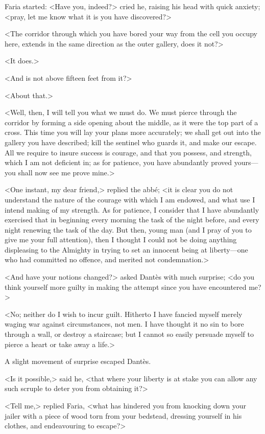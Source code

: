  Faria started: <Have you, indeed?> cried he, raising his head with quick anxiety; <pray, let me know what it is you have discovered?> 

 <The corridor through which you have bored your way from the cell you occupy here, extends in the same direction as the outer gallery, does it not?>

<It does.> 

 <And is not above fifteen feet from it?> 

 <About that.> 

 <Well, then, I will tell you what we must do. We must pierce through the corridor by forming a side opening about the middle, as it were the top part of a cross. This time you will lay your plans more accurately; we shall get out into the gallery you have described; kill the sentinel who guards it, and make our escape. All we require to insure success is courage, and that you possess, and strength, which I am not deficient in; as for patience, you have abundantly proved yours—you shall now see me prove mine.> 

 <One instant, my dear friend,> replied the abbé; <it is clear you do not understand the nature of the courage with which I am endowed, and what use I intend making of my strength. As for patience, I consider that I have abundantly exercised that in beginning every morning the task of the night before, and every night renewing the task of the day. But then, young man (and I pray of you to give me your full attention), then I thought I could not be doing anything displeasing to the Almighty in trying to set an innocent being at liberty—one who had committed no offence, and merited not condemnation.> 

 <And have your notions changed?> asked Dantès with much surprise; <do you think yourself more guilty in making the attempt since you have encountered me?> 

 <No; neither do I wish to incur guilt. Hitherto I have fancied myself merely waging war against circumstances, not men. I have thought it no sin to bore through a wall, or destroy a staircase; but I cannot so easily persuade myself to pierce a heart or take away a life.> 

 A slight movement of surprise escaped Dantès. 

 <Is it possible,> said he, <that where your liberty is at stake you can allow any such scruple to deter you from obtaining it?> 

 <Tell me,> replied Faria, <what has hindered you from knocking down your jailer with a piece of wood torn from your bedstead, dressing yourself in his clothes, and endeavouring to escape?> 


